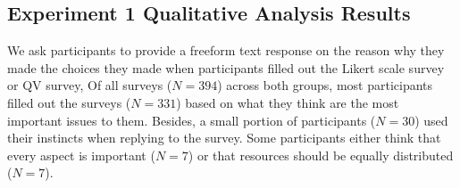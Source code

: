 \subsection{Experiment 1 Qualitative Analysis Results}\label{results-1-qual}
We ask participants to provide a freeform text response on the reason why they made the choices they made
when participants filled out the Likert scale survey or QV survey,
Of all surveys ($N=394$) across both groups, most participants filled out the surveys ($N=331$) based on what they think are the most important issues to them. %
Besides, a small portion of participants ($N=30$) used their instincts when replying to the survey.
Some participants either think that every aspect is important ($N=7$) or that resources should be equally distributed ($N=7$).

